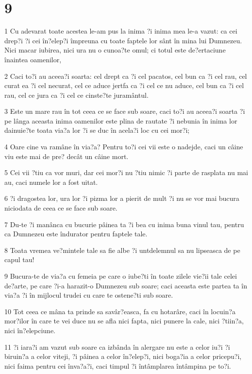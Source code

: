 \chapter{9}

\par 1 Cu adevarat toate acestea le-am pus la inima ?i inima mea le-a vazut: ca cei drep?i ?i cei în?elep?i împreuna cu toate faptele lor sânt în mina lui Dumnezeu. Nici macar iubirea, nici ura nu o cunoa?te omul; ci totul este de?ertaciune înaintea oamenilor,
\par 2 Caci to?i au aceea?i soarta: cel drept ca ?i cel pacatos, cel bun ca ?i cel rau, cel curat ea ?i cel necurat, cel ce aduce jertfa ca ?i cel ce nu aduce, cel bun ca ?i cel rau, cel ce jura ca ?i cel ce cinste?te juramântul.
\par 3 Este un mare rau în tot ceea ce se face sub soare, caci to?i au aceea?i soarta ?i pe lânga aceasta inima oamenilor este plina de rautate ?i nebunia în inima lor dainuie?te toata via?a lor ?i se duc în acela?i loc cu cei mor?i;
\par 4 Oare cine va ramâne în via?a? Pentru to?i cei vii este o nadejde, caci un câine viu este mai de pre? decât un câine mort.
\par 5 Cei vii ?tiu ca vor muri, dar cei mor?i nu ?tiu nimic ?i parte de rasplata nu mai au, caci numele lor a fost uitat.
\par 6 ?i dragostea lor, ura lor ?i pizma lor a pierit de mult ?i nu se vor mai bucura niciodata de ceea ce se face sub soare.
\par 7 Du-te ?i manânca cu bucurie pâinea ta ?i bea cu inima buna vinul tau, pentru ca Dumnezeu este îndurator pentru faptele tale.
\par 8 Toata vremea ve?mintele tale sa fie albe ?i untdelemnul sa nu lipseasca de pe capul tau!
\par 9 Bucura-te de via?a cu femeia pe care o iube?ti în toate zilele vie?ii tale celei de?arte, pe care ?i-a harazit-o Dumnezeu sub soare; caci aceasta este partea ta în via?a ?i în mijlocul trudei cu care te ostene?ti sub soare.
\par 10 Tot ceea ce mâna ta prinde sa savâr?easca, fa cu hotarâre, caci în locuin?a mor?ilor în care te vei duce nu se afla nici fapta, nici punere la cale, nici ?tiin?a, nici în?elepciune.
\par 11 ?i iara?i am vazut sub soare ca izbânda în alergare nu este a celor iu?i ?i biruin?a a celor viteji, ?i pâinea a celor în?elep?i, nici boga?ia a celor pricepu?i, nici faima pentru cei înva?a?i, caci timpul ?i întâmplarea întâmpina pe to?i.
